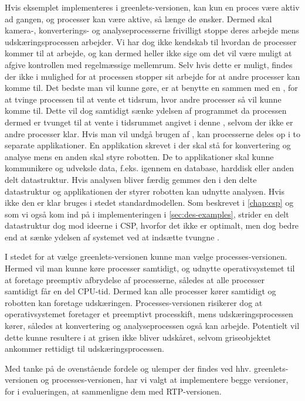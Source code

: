 Hvis eksemplet implementeres i greenlets-versionen, kan kun  en proces være aktiv ad gangen, og processer kan være aktive, så længe de ønsker. Dermed skal kamera-, konverterings- og analyseprocesserne frivilligt stoppe deres arbejde mens  udskæringsprocessen arbejder.  Vi har dog ikke kendskab til hvordan de processer kommer til at arbejde, og kan dermed heller ikke sige om det vil være muligt at afgive kontrollen med regelmæssige mellemrum. Selv hvis dette er muligt, findes der ikke i \pycsp mulighed for at processen stopper sit arbejde for at andre  processer kan komme til. Det bedste man vil kunne gøre, er at benytte en   sammen med en , for at tvinge processen til at vente et tidsrum, hvor andre processer så vil kunne komme til. Dette vil dog samtidigt sænke ydelsen af programmet da processen dermed er tvunget til at vente i tidsrummet angivet i denne , selvom der ikke er andre processer klar. Hvis man vil undgå brugen af , kan processerne deles op i to separate applikationer. En applikation skrevet i \pycsp der skal stå for konvertering og analyse mens en anden skal styre robotten. De to applikationer skal kunne kommunikere og  udveksle data, f.eks. igennem en database, harddisk eller anden delt datastruktur. Hvis analysen bliver færdig gemmes den i den delte datastruktur og applikationen der styrer robotten kan udnytte analysen. Hvis ikke den er klar bruges i stedet standardmodellen. Som beskrevet i \autoref{chap:csp} og som vi også kom ind på i implementeringen i \autoref{sec:des-examples}, strider en delt datastruktur dog mod ideerne i CSP, hvorfor det ikke er optimalt, men dog bedre end at sænke ydelsen af systemet ved at indsætte tvungne .

I stedet for at vælge greenlets-versionen kunne man vælge processes-versionen. Hermed vil man kunne køre processer samtidigt, og udnytte operativsystemet til at foretage preemptiv afbrydelse af processerne, således at alle processer samtidigt får en del CPU-tid. Dermed kan alle processer kører samtidigt og robotten kan foretage udskæringen. Processes-versionen risikerer dog at operativsystemet foretager et preemptivt processkift, mens udskæringsprocessen kører, således at konvertering og  analyseprocessen også kan arbejde. Potentielt vil dette kunne resultere i at grisen ikke bliver udskåret, selvom griseobjektet ankommer rettidigt til udskæringsprocessen.

Med tanke på de ovenstående fordele og ulemper der findes ved hhv.  greenlets-versionen og processes-versionen,  har vi valgt at implementere begge versioner, for i evalueringen, at sammenligne dem med RTP-versionen. 

